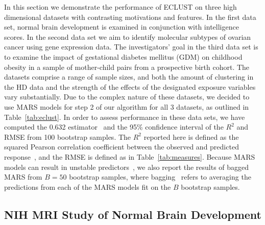 In this section we demonstrate the performance of ECLUST on three high dimensional datasets with contrasting motivations and features. In the first data set, normal brain development is examined in conjunction with intelligence scores. In the second data set we aim to identify molecular subtypes of ovarian cancer using gene expression data. The investigators' goal in the third data set is to examine the impact of gestational diabetes mellitus (GDM) on childhood obesity in a sample of mother-child pairs from a prospective birth cohort. The datasets comprise a range of sample sizes, and both the amount of clustering in the HD data and the strength of the effects of the designated exposure variables vary substantially.  Due to the complex nature of these datasets, we decided to use MARS models for step 2 of our algorithm for all 3 datasets, as outlined in Table~\ref{tab:eclust}. In order to assess performance in these data sets, we have computed the 0.632 estimator~\citep{efron1983estimating} and the 95\% confidence interval of the $R^2$ and RMSE from 100 bootstrap samples. The $R^2$ reported here is defined as the squared Pearson correlation coefficient between the observed and predicted response~\citep{kvaalseth1985cautionary}, and the RMSE is defined as in Table~\ref{tab:measures}. Because MARS models can result in unstable predictors~\citep{kuhn2008caret}, we also report the results of bagged MARS from $B=50$ bootstrap samples, where bagging~\citep{breiman1996bagging} refers to averaging the predictions from each of the MARS models fit on the $B$ bootstrap samples. 


\subsection{NIH MRI Study of Normal Brain Development} \label{sec:nih}

